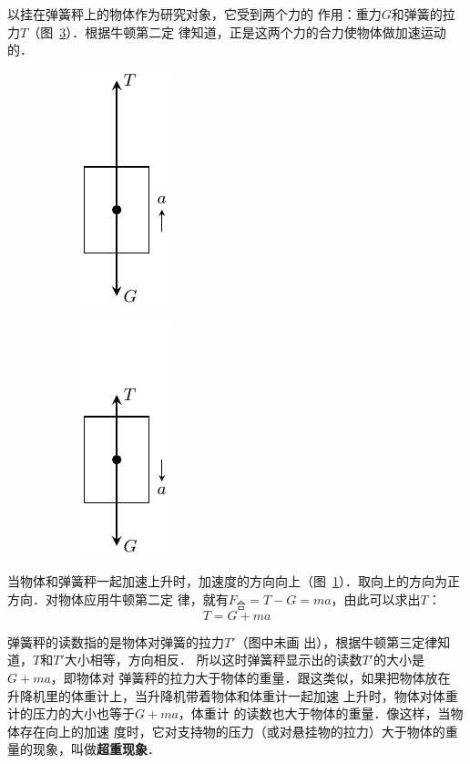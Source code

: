     以挂在弹簧秤上的物体作为研究对象，它受到两个力的
作用：重力$G$和弹簧的拉力$T$（图~\ref{fig_A_3-13}）．根据牛顿第二定
律知道，正是这两个力的合力使物体做加速运动的．

\begin{figure}[htp]
    \centering
    \begin{subfigure} {0.3\linewidth} 
		\centering
		\includegraphics{fig/A/3-13a.pdf} 
		\caption{}\label{fig_A_3-13a} 
	\end{subfigure}
	\hfil
	\begin{subfigure} {0.3\linewidth} 
		\centering
		\includegraphics{fig/A/3-13b.pdf} 
		\caption{}\label{fig_A_3-13b} 
	\end{subfigure}
    \caption{}\label{fig_A_3-13}
\end{figure}

    当物体和弹簧秤一起加速上升时，加速度的方向向上（图~\ref{fig_A_3-13a}）．取向上的方向为正方向．对物体应用牛顿第二定
律，就有$F_{\text{合}}=T-G=ma$，由此可以求出$T$：
\[ T=G+ma\]

    弹簧秤的读数指的是物体对弹簧的拉力$T'$（图中未画
出），根据牛顿第三定律知道，$T$和$T'$大小相等，方向相反．
所以这时弹簧秤显示出的读数$T'$的大小是$G+ma$，即物体对
弹簧秤的拉力大于物体的重量．跟这类似，如果把物体放在
升降机里的体重计上，当升降机带着物体和体重计一起加速
上升时，物体对体重计的压力的大小也等于$G+ma$，体重计
的读数也大于物体的重量．像这样，当物体存在向上的加速
度时，它对支持物的压力（或对悬挂物的拉力）大于物体的重
量的现象，叫做\textbf{超重现象}．

